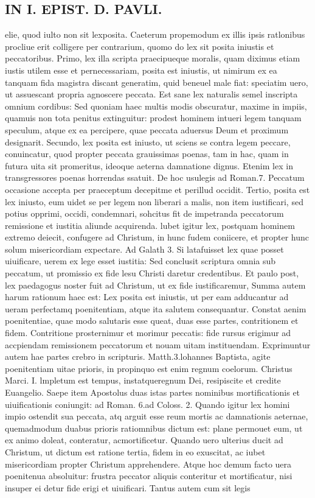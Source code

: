\documentclass{article}
\begin{document}
\begin{pages}
\section*{IN I. EPIST. D. PAVLI. }
\marginpar{[ p.27 ]}\pstart elie, quod iulto non sit lexposita. Caeterum propemodum ex illis ipsis ratlonibus procliue erit colligere per contrarium, quomo do lex sit posita iniustis et peccatoribus. Primo, lex illa scripta praecipueque  moralis, quam diximus etiam iustis utilem esse et pernecessariam, posita est iniustis, ut nimirum ex ea tanquam fida magistra discant generatim, quid beneuel male fiat: speciatim uero, ut assuescant propria agnoscere peccata. Est sane lex naturalis semel inscripta omnium cordibus: Sed quoniam haec multis modis obscuratur, maxime in impiis, quamuis non tota penitus extinguitur: prodest hominem intueri legem tanquam speculum, atque  ex ea percipere, quae peccata aduersus Deum et proximum designarit.  \pend\pstart Secundo, lex posita est iniusto, ut sciens se contra legem peccare, conuincatur, quod propter peccata grauissimas poenas, tam in hac, quam in futura uita sit promeritus, ideoque  aeterna damnatione dignus. Etenim lex in transgressores poenas horrendas ssatuit. De hoc usulegis ad Roman.7. Peccatum occasione accepta per praeceptum decepitme et perillud occidit. Tertio, posita est lex iniusto, eum uidet se per legem non liberari a malis, non item iustificari, sed potius opprimi, occidi, condemnari, sohcitus fit de impetranda peccatorum remissione et iustitia aliunde acquirenda. lubet igitur lex, postquam hominem extremo deiecit, confugere ad Christum, in hunc fudem coniicere, et propter hunc solum misericordiam expectare. Ad Galath 3. Si latafuisset lex quae posset uiuificare, uerem ex lege esset iustitia: Sed conclusit scriptura omnia   sub peccatum, ut promissio ex fide lesu Christi daretur credentibus. Et paulo post, lex   paedagogus noster fuit ad Christum, ut ex fide iustificaremur,  \pend\pstart Summa autem harum rationum haec est: Lex posita est iniustis, ut per eam adducantur ad ueram perfectamq poenitentiam, atque  ita salutem consequantur. Constat aenim poenitentiae, quae modo salutaris esse queat, duas esse partes, contritionem et fidem. Contritione prosternimur et morimur peccatis: fide rursus erigimur ad accpiendam remissionem peccatorum et nouam uitam instituendam. Exprimuntur autem hae partes crebro in scripturis. Matth.3.lohannes Baptista, agite poenitentiam uitae prioris, in propinquo est enim regnum coelorum. Christus Marci. I. lmpletum est tempus, instatqueregnum Dei, resipiscite et credite Euangelio. Saepe item Apostolus duas istas partes nominibus mortificationis et uiuificationis coniungit: ad Roman. 6.ad Coloss. 2. Quando igitur lex homini impio ostendit sua peccata, atq arguit esse reum mortis ac damnationis aeternae, quemadmodum duabus prioris ratiomnibus dictum est: plane permouet eum, ut ex animo doleat, conteratur, acmortificetur. Quando uero ulterius ducit ad Christum, ut dictum est ratione tertia, fidem in eo exuscitat, ac iubet misericordiam propter Christum apprehendere. Atque  hoc demum facto uera poenitenua absoluitur: frustra peccator aliquis conteritur et mortificatur, nisi insuper ei detur fide erigi et uiuificari. Tantus autem cum sit legis 
\end{pages}
\end{document}
